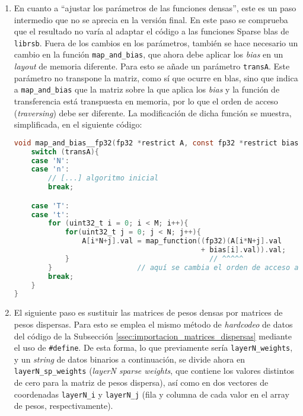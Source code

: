 \begin{enumerate}
    \item En cuanto a ``ajustar los parámetros de las funciones densas'', este es un paso intermedio que no se aprecia en la versión final. En este paso se comprueba que el resultado no varía al adaptar el código a las funciones Sparse \acrshort{blas} de \texttt{librsb}. Fuera de los cambios en los parámetros, también se hace necesario un cambio en la función \texttt{map\_and\_bias}, que ahora debe aplicar los \textit{bias} en un \textit{layout} de memoria diferente. Para esto se añade un parámetro \texttt{transA}. Este parámetro no transpone la matriz, como sí que ocurre en \acrshort{blas}, sino que indica a \texttt{map\_and\_bias} que la matriz sobre la que aplica los \textit{bias} y la función de transferencia está transpuesta en memoria, por lo que el orden de acceso (\textit{traversing}) debe ser diferente. La modificación de dicha función se muestra, simplificada, en el siguiente código:\medskip
\begin{lstlisting}[language=C]
void map_and_bias__fp32(fp32 *restrict A, const fp32 *restrict bias, const uint32_t M, const uint32_t N, const char transA, fp32 (* map_function)(fp32 x)){
    switch (transA){
    case 'N':
    case 'n':
        // [...] algoritmo inicial
        break;

    case 'T':
    case 't':
        for (uint32_t i = 0; i < M; i++){
            for(uint32_t j = 0; j < N; j++){
                A[i*N+j].val = map_function((fp32)(A[i*N+j].val 
                                            + bias[i].val)).val;
            }                                 // ^^^^^
        }                    // aquí se cambia el orden de acceso a bias
        break;
    }
}
\end{lstlisting}

    \item El siguiente paso es sustituir las matrices de pesos densas por matrices de pesos dispersas. Para esto se emplea el mismo método de \textit{hardcodeo} de datos del código de la Subsección \ref{ssec:importacion_matrices_dispersas} mediante el uso de \texttt{\#define}. De esta forma, lo que previamente sería \texttt{layerN\_weights}, y un \textit{string} de datos binarios a continuación, se divide ahora en \texttt{layerN\_sp\_weights} (\textit{layerN sparse weights}, que contiene los valores distintos de cero para la matriz de pesos dispersa), así como en dos vectores de coordenadas \texttt{layerN\_i} y \texttt{layerN\_j} (fila y columna de cada valor en el array de pesos, respectivamente).
    

\end{enumerate}

